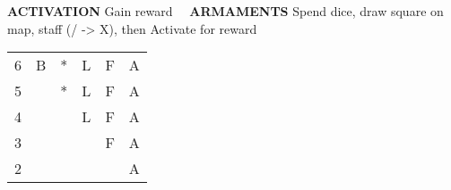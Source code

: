 \begin{flushleft}
\textbf{ACTIVATION} \textcolor{supplemental}{Gain reward} \ \ \textbf{ARMAMENTS} \textcolor{supplemental}{Spend dice, draw square on map, staff (/ -> X), then Activate for reward}
\end{flushleft}
\begin{tabular}{|l|lllll}
\cline{1-1}
6 & \cellcolor{supplemental}B & *                         & L                         & F                         & A                         \\ \cline{1-1}
5 &                           & \cellcolor{supplemental}* & L                         & F                         & A                         \\ \cline{1-1}
4 &                           &                           & \cellcolor{supplemental}L & F                         & A                         \\ \cline{1-1}
3 &                           &                           &                           & \cellcolor{supplemental}F & A                         \\ \cline{1-1}
2 &                           &                           &                           &                           & \cellcolor{supplemental}A \\ \cline{1-1}
\end{tabular}
